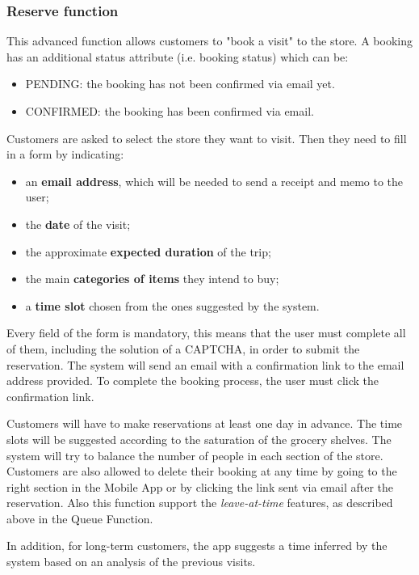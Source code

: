 	\subsubsection{Reserve function}
	This advanced function allows customers to "book a visit" to the store.
	A booking has an additional status attribute (i.e. booking status) which can be:
	\begin{itemize}
		\item PENDING: the booking has not been confirmed via email yet.
		\item CONFIRMED: the booking has been confirmed via email.
	\end{itemize}

	Customers are asked to select the store they want to visit. Then they need to fill in a form by indicating:
	\begin{itemize}
		\item an \textbf{email address}, which will be needed to send a receipt and memo to the user;
		\item the \textbf{date} of the visit;
		\item the approximate \textbf{expected duration} of the trip;
	 	\item the main \textbf{categories of items} they intend to buy;
	    \item a \textbf{time slot} chosen from the ones suggested by the system.
	\end{itemize}
	Every field of the form is mandatory, this means that the user must complete all of them, including the solution of a CAPTCHA, in order to submit the reservation.
	The system will send an email with a confirmation link to the email address provided. To complete the booking process, the user must click the confirmation link.
	
	Customers will have to make reservations at least one day in advance.
	The time slots will be suggested according to the saturation of the grocery shelves. The system will try to balance the number of people in each section of the store.\newline
	Customers are also allowed to delete their booking at any time by going to the right section in the Mobile App or by clicking the link sent via email after the reservation.
	Also this function support the \textit{leave-at-time} features, as described above in the Queue Function.
	
	In addition, for long-term customers, the app suggests a time inferred by the system based on an analysis of the previous visits.

